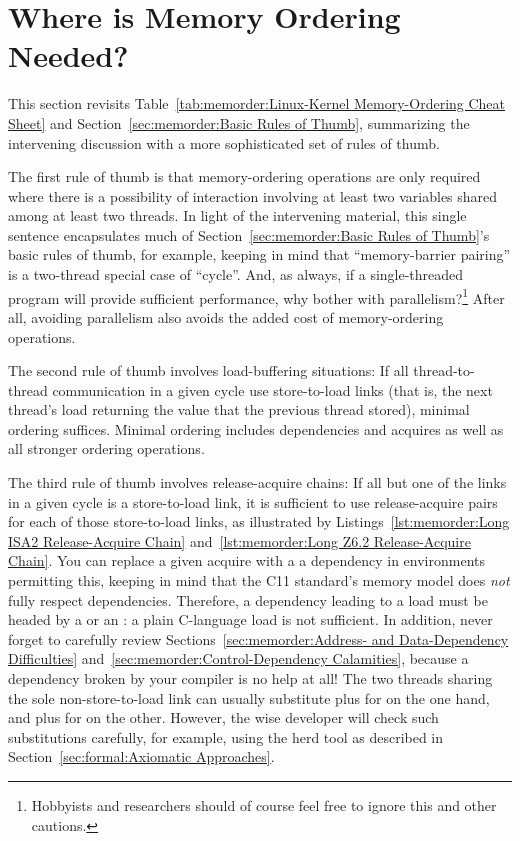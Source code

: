 \section{Where is Memory Ordering Needed?}
\label{sec:memorder:Where is Memory Ordering Needed?}

This section revisits
Table~\ref{tab:memorder:Linux-Kernel Memory-Ordering Cheat Sheet}
and Section~\ref{sec:memorder:Basic Rules of Thumb},
summarizing the intervening discussion with a more sophisticated
set of rules of thumb.

The first rule of thumb is that memory-ordering operations are only
required where there is a possibility of interaction involving at least
two variables shared among at least two threads.
In light of the intervening material, this single sentence encapsulates much of
Section~\ref{sec:memorder:Basic Rules of Thumb}'s basic rules of thumb,
for example, keeping in mind that ``memory-barrier pairing'' is a
two-thread special case of ``cycle''.
And, as always, if a single-threaded program will provide sufficient
performance, why bother with parallelism?\footnote{
	Hobbyists and researchers should of course feel free to ignore
	this and other cautions.}
After all, avoiding parallelism also avoids the added cost of
memory-ordering operations.

The second rule of thumb involves load-buffering situations:
If all thread-to-thread communication in a given cycle use store-to-load links
(that is, the next thread's load returning the value that the previous thread
stored), minimal ordering suffices.
Minimal ordering includes dependencies and acquires as well as all stronger
ordering operations.

The third rule of thumb involves release-acquire chains:
If all but one of the links in a given cycle is a store-to-load
link, it is sufficient to use release-acquire pairs for each of
those store-to-load links, as illustrated by
Listings~\ref{lst:memorder:Long ISA2 Release-Acquire Chain}
and~\ref{lst:memorder:Long Z6.2 Release-Acquire Chain}.
You can replace a given acquire with a a dependency in environments permitting
this, keeping in mind that the C11 standard's memory model does \emph{not}
fully respect dependencies.
Therefore, a dependency leading to a load must be headed by
a  or an :
a plain C-language load is not sufficient.
In addition, never forget to carefully review
Sections~\ref{sec:memorder:Address- and Data-Dependency Difficulties}
and~\ref{sec:memorder:Control-Dependency Calamities}, because
a dependency broken by your compiler is no help at all!
The two threads sharing the sole non-store-to-load link can
usually substitute  plus  for
 on the one hand,
and  plus  for 
on the other.
However, the wise developer will check such substitutions carefully,
for example, using the herd tool as described in
Section~\ref{sec:formal:Axiomatic Approaches}.

